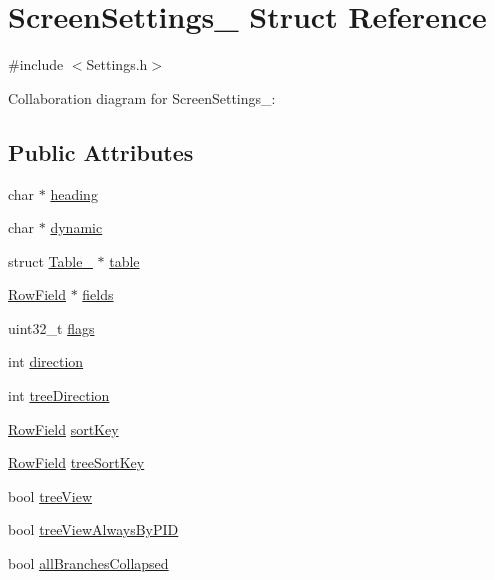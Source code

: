\hypertarget{structScreenSettings__}{}\section{Screen\+Settings\+\_\+ Struct Reference}
\label{structScreenSettings__}


{\ttfamily \#include $<$Settings.\+h$>$}



Collaboration diagram for Screen\+Settings\+\_\+\+:
\subsection*{Public Attributes}
\begin{DoxyCompactItemize}
\item 
char $\ast$ \hyperlink{structScreenSettings___a20ed34963f2ad13d079793bcca11d64c}{heading}
\item 
char $\ast$ \hyperlink{structScreenSettings___ae5be6d58b07522179839f5054554343d}{dynamic}
\item 
struct \hyperlink{structTable__}{Table\+\_\+} $\ast$ \hyperlink{structScreenSettings___abc33fe6d3d75851209235950bc505f91}{table}
\item 
\hyperlink{RowField_8h_a7a6f9b44bcdc803955266dc3e8fe58cb}{Row\+Field} $\ast$ \hyperlink{structScreenSettings___a69c0900f3a8d89cb8c9e420d850813e2}{fields}
\item 
uint32\+\_\+t \hyperlink{structScreenSettings___a933fa18fb1f6b52cf712b58052973f02}{flags}
\item 
int \hyperlink{structScreenSettings___adc3a59a0d848820c58273d925b5de41e}{direction}
\item 
int \hyperlink{structScreenSettings___ad239cf98329b464c84834014c56416b8}{tree\+Direction}
\item 
\hyperlink{RowField_8h_a7a6f9b44bcdc803955266dc3e8fe58cb}{Row\+Field} \hyperlink{structScreenSettings___ac136d9ad2c6bebf7c42d379d25adca1d}{sort\+Key}
\item 
\hyperlink{RowField_8h_a7a6f9b44bcdc803955266dc3e8fe58cb}{Row\+Field} \hyperlink{structScreenSettings___ab7fc4d25dbff4372340d14ceda7e4cdb}{tree\+Sort\+Key}
\item 
bool \hyperlink{structScreenSettings___adaff8a1713d8c801ecd6d0011ab0961c}{tree\+View}
\item 
bool \hyperlink{structScreenSettings___af291d260b3d35edeb9dddd2a824a49f6}{tree\+View\+Always\+By\+P\+ID}
\item 
bool \hyperlink{structScreenSettings___adc4d8da52765fa53553ef1f4e420599a}{all\+Branches\+Collapsed}
\end{DoxyCompactItemize}


